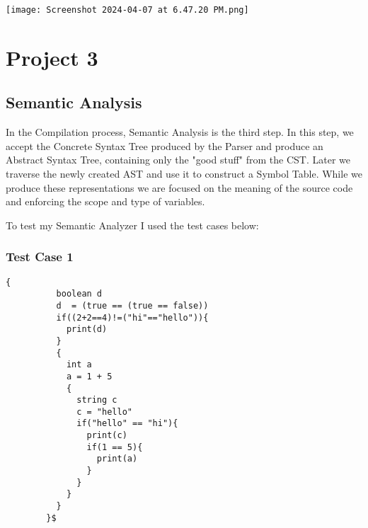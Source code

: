 \documentclass[letterpaper, 10pt,DIV=13]{scrartcl}
\numberwithin{equation}{section} %
\numberwithin{figure}{section} %
\numberwithin{table}{section} %
\begin{document}
\begin{center}
        \texttt{[image: Screenshot 2024-04-07 at 6.47.20 PM.png]}
\end{center}




\pagebreak

\section*{Project 3}

\subsection*{Semantic Analysis}
In the Compilation process, Semantic Analysis is the third step. In this step, we accept the Concrete Syntax Tree produced by the Parser and produce an Abstract Syntax Tree, containing only the "good stuff" from the CST. Later we traverse the newly created AST and use it to construct a Symbol Table. While we produce these representations we are focused on the meaning of the source code and enforcing the scope and type of variables.

To test my Semantic Analyzer I used the test cases below:


\subsubsection*{Test Case 1}
    \lstset{numbers=left, numberstyle=\tiny, stepnumber=1, numbersep=5pt, basicstyle=\footnotesize\ttfamily}
    \begin{lstlisting}[frame=single, ]
        {
          boolean d
          d  = (true == (true == false))
          if((2+2==4)!=("hi"=="hello")){
            print(d)
          }
          {
            int a
            a = 1 + 5
            {
              string c
              c = "hello"
              if("hello" == "hi"){
                print(c)
                if(1 == 5){
                  print(a)
                }
              }
            }
          }
        }$
    \end{lstlisting}
\end{document}
